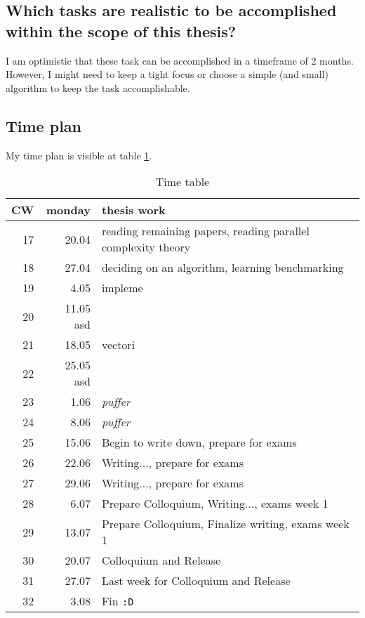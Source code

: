 \documentclass{article}
\begin{document}
    \subsection{Which tasks are realistic to be accomplished within the scope of this thesis?}
    I am optimistic that these task can be accomplished in a timeframe of 2 months. However, I might need to keep a tight focus or
    choose a simple (and small) algorithm to keep the task accomplishable.

    \subsection{Time plan}
    My time plan is visible at table \ref{timetable}.
    \begin{table}[h]
        \begin{center}
        \caption{Time table} %
        \label{timetable}
        \begin{tabular}{rrl}
            \toprule
            CW & monday & thesis work \\
            \midrule
            17 & 20.04 & reading remaining papers, reading parallel complexity theory \\
            18 & 27.04 & deciding on an algorithm, learning benchmarking  \\
            19 & 4.05  & impleme \\
            20 & 11.05  asd \\
            21 & 18.05 & vectori \\
            22 & 25.05 asd \\
            23 & 1.06  & \textit{puffer} \\
            24 & 8.06  & \textit{puffer} \\
            25 & 15.06 & Begin to write down, prepare for exams\\
            26 & 22.06 & Writing..., prepare for exams \\
            27 & 29.06 & Writing..., prepare for exams \\
            28 & 6.07  & Prepare Colloquium, Writing..., exams week 1 \\
            29 & 13.07 & Prepare Colloquium, Finalize writing, exams week 1 \\
            30 & 20.07 & Colloquium and Release \\
            31 & 27.07 & Last week for Colloquium and Release \\
            32 & 3.08  & Fin \texttt{:D} \\
        \end{tabular}
        \end{center}
    \end{table}
\end{document}

